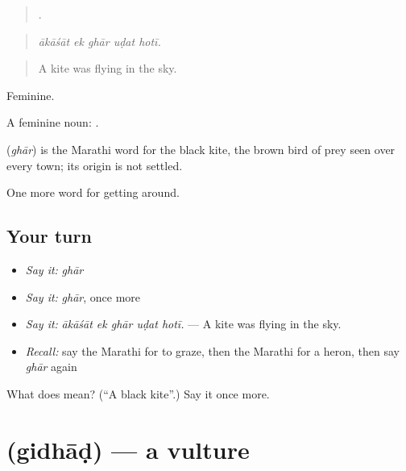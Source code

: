 \begin{quote}
    .
\end{quote}

\begin{quote}
\emph{ākāśāt ek ghār uḍat hotī.}
\end{quote}

\begin{quote}
A kite was flying in the sky.
\end{quote}

Feminine.

A feminine noun:   .

\begin{cousinweb}
\textbf{} (\emph{ghār}) is the Marathi word for the black kite, the brown bird of prey seen over every town; its origin is not settled.
\end{cousinweb}

\begin{grammarlens}[title={What you've built}]
One more word for getting around.
\end{grammarlens}

\subsection*{Your turn}
\begin{itemize}
\raggedright
  \item \emph{Say it:} \emph{ghār}
  \item \emph{Say it:} \emph{ghār}, once more
  \item \emph{Say it:} \emph{ākāśāt ek ghār uḍat hotī.} — A kite was flying in the sky.
  \item \emph{Recall:} say the Marathi for to graze, then the Marathi for a heron, then say \emph{ghār} again
\end{itemize}

\begin{tcolorbox}[breakable,colback=teal!4,colframe=teal!35!black,title={Before you move on}]
What does  mean? (\textquotedblleft{}A black kite\textquotedblright{}.) Say it once more.
\end{tcolorbox}
\section[\texorpdfstring{\mr{गिधाड} (gidhāḍ)}{गिधाड (gidhāḍ)}]{ (gidhāḍ) — a vulture}

\label{lesson:MR-C447-gidhad}



